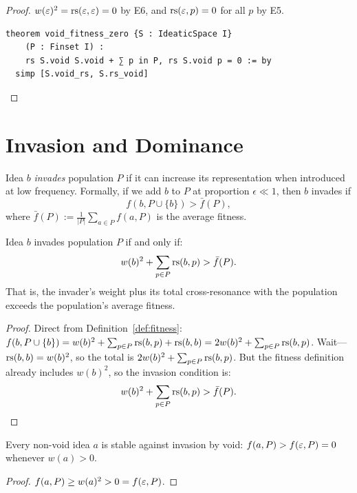 \begin{proof}
$w(\varepsilon)^2 = \mathrm{rs}(\varepsilon, \varepsilon) = 0$ by E6, and $\mathrm{rs}(\varepsilon, p) = 0$ for all
$p$ by E5.

\begin{lstlisting}[caption={Lean 4: Void has zero fitness}]
theorem void_fitness_zero {S : IdeaticSpace I}
    (P : Finset I) :
    rs S.void S.void + ∑ p in P, rs S.void p = 0 := by
  simp [S.void_rs, S.rs_void]
\end{lstlisting}
\end{proof}


\section{Invasion and Dominance}

\begin{definition}[Invasion]
\label{def:invasion}
Idea $b$ \emph{invades} population $P$ if it can increase its representation
when introduced at low frequency.  Formally, if we add $b$ to $P$ at
proportion $\epsilon \ll 1$, then $b$ invades if
\[
  f(b, P \cup \{b\}) > \bar{f}(P),
\]
where $\bar{f}(P) := \frac{1}{|P|} \sum_{a \in P} f(a, P)$ is the average
fitness.
\end{definition}

\begin{theorem}
\label{thm:invasion}
Idea $b$ invades population $P$ if and only if:
\[
  w(b)^2 + \sum_{p \in P} \mathrm{rs}(b, p) > \bar{f}(P).
\]
That is, the invader's weight plus its total cross-resonance with the
population exceeds the population's average fitness.
\end{theorem}

\begin{proof}
Direct from Definition~\ref{def:fitness}: $f(b, P \cup \{b\}) = w(b)^2 +
\sum_{p \in P} \mathrm{rs}(b, p) + \mathrm{rs}(b, b) = 2w(b)^2 + \sum_{p \in P} \mathrm{rs}(b, p)$.
Wait---$\mathrm{rs}(b,b) = w(b)^2$, so the total is $2w(b)^2 + \sum_{p \in P}
\mathrm{rs}(b, p)$.  But the fitness definition already includes $w(b)^2$, so the
invasion condition is:
\[
  w(b)^2 + \sum_{p \in P} \mathrm{rs}(b, p) > \bar{f}(P). \qedhere
\]
\end{proof}

\begin{corollary}
\label{cor:void-stable}
Every non-void idea $a$ is stable against invasion by void:
$f(a, P) > f(\varepsilon, P) = 0$ whenever $w(a) > 0$.
\end{corollary}

\begin{proof}
$f(a, P) \geq w(a)^2 > 0 = f(\varepsilon, P)$.
\end{proof}

